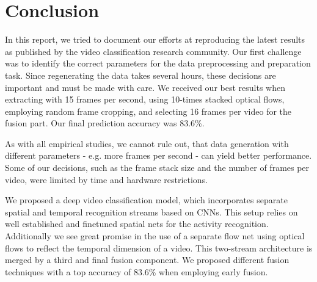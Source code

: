\section{Conclusion}
\label{sec:conclusion}

In this report, we tried to document our efforts at reproducing the latest results as published by the video classification research community.
Our first challenge was to identify the correct parameters for the data preprocessing and preparation task.
Since regenerating the data takes several hours, these decisions are important and must be made with care.
We received our best results when extracting with 15 frames per second,  using 10-times stacked optical flows, employing random frame cropping, and selecting 16 frames per video for the fusion part.
Our final prediction accuracy was 83.6\%.

As with all empirical studies, we cannot rule out, that data generation with different parameters - e.g. more frames per second - can yield better performance.
Some of our decisions, such as the frame stack size and the number of frames per video, were limited by time and hardware restrictions.

We proposed a deep video classification model, which incorporates separate spatial and temporal recognition streams based on CNNs. This setup relies on well established and finetuned spatial nets for the activity recognition. Additionally we see great promise in the use of a separate flow net using optical flows to reflect the temporal dimension of a video. This two-stream architecture is merged by a third and final fusion component. We proposed different fusion techniques with a top accuracy of 83.6\% when employing early fusion.

